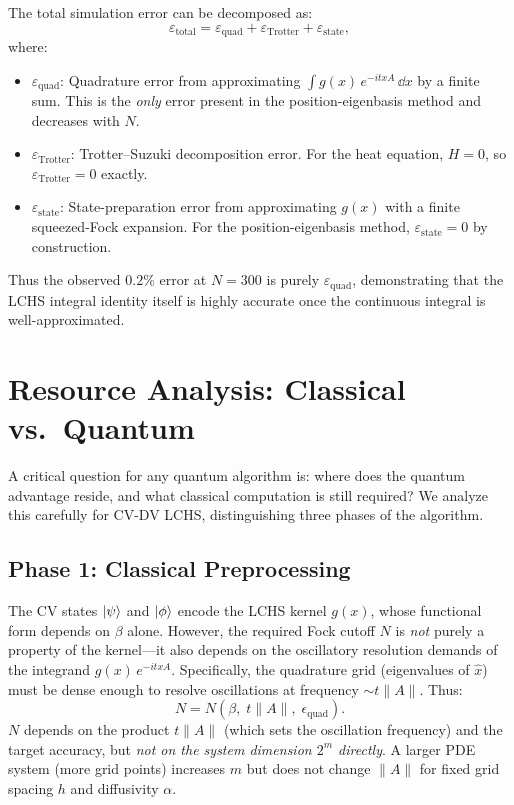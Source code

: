 \documentclass[11pt]{article}
\begin{document}
The total simulation error can be decomposed as:
\begin{equation}\label{eq:error-budget}
  \varepsilon_{\mathrm{total}} = \varepsilon_{\mathrm{quad}}
  + \varepsilon_{\mathrm{Trotter}} + \varepsilon_{\mathrm{state}},
\end{equation}
where:
\begin{itemize}
  \item $\varepsilon_{\mathrm{quad}}$: Quadrature error from approximating
        $\int g(x)\,e^{-itxA}\,\dd{x}$ by a finite sum.  This is the
        \emph{only} error present in the position-eigenbasis method and
        decreases with $N$.
  \item $\varepsilon_{\mathrm{Trotter}}$: Trotter--Suzuki decomposition
        error.  For the heat equation, $H=0$, so
        $\varepsilon_{\mathrm{Trotter}} = 0$ exactly.
  \item $\varepsilon_{\mathrm{state}}$: State-preparation error from
        approximating $g(x)$ with a finite squeezed-Fock expansion.
        For the position-eigenbasis method,
        $\varepsilon_{\mathrm{state}} = 0$ by construction.
\end{itemize}

Thus the observed $0.2\%$ error at $N=300$ is purely
$\varepsilon_{\mathrm{quad}}$, demonstrating that the LCHS integral identity
itself is highly accurate once the continuous integral is well-approximated.

\section{Resource Analysis: Classical vs.\ Quantum}

A critical question for any quantum algorithm is: where does the quantum
advantage reside, and what classical computation is still required?
We analyze this carefully for CV-DV LCHS, distinguishing three phases
of the algorithm.

\subsection{Phase 1: Classical Preprocessing}

The CV states $\ket{\psi}$ and $\ket{\phi}$ encode the LCHS kernel
$g(x)$, whose functional form depends on $\beta$ alone.
However, the required Fock cutoff $N$ is \emph{not} purely a property
of the kernel---it also depends on the oscillatory resolution demands
of the integrand $g(x)\,e^{-itxA}$.  Specifically, the quadrature grid
(eigenvalues of $\hat{x}$) must be dense enough to resolve oscillations
at frequency $\sim t\|A\|$.  Thus:
\begin{equation}\label{eq:N-dependence}
  N = N(\beta,\; t\|A\|,\; \epsilon_{\mathrm{quad}}).
\end{equation}
$N$ depends on the product $t\|A\|$ (which sets the oscillation frequency)
and the target accuracy, but \emph{not on the system dimension $2^m$
directly}.  A larger PDE system (more grid points) increases $m$ but
does not change $\|A\|$ for fixed grid spacing $h$ and diffusivity $\alpha$.
\end{document}
